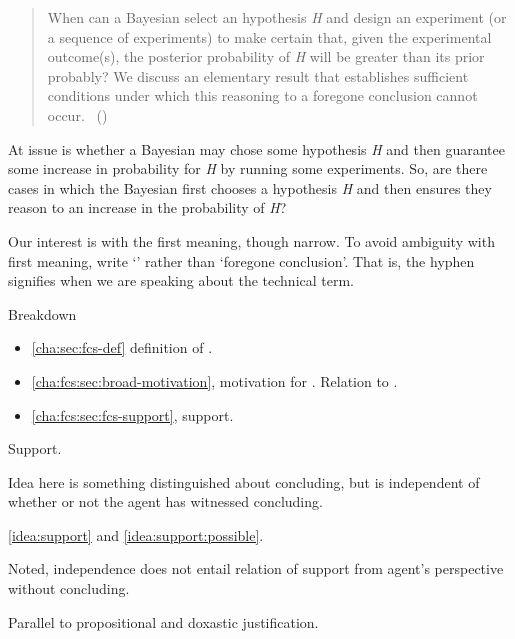 \begin{note}
  \begin{quote}
    When can a Bayesian select an hypothesis \emph{H} and design an experiment (or a sequence of experiments) to make certain that, given the experimental outcome(s), the posterior probability of \emph{H} will be greater than its prior probably?
    We discuss an elementary result that establishes sufficient conditions under which this reasoning to a foregone conclusion cannot occur.%
    \mbox{ }\hfill\mbox{(\citeyear[1228]{Kadane:1996vu})}
  \end{quote}

  At issue is whether a Bayesian may chose some hypothesis \emph{H} and then guarantee some increase in probability for \emph{H} by running some experiments.
  So, are there cases in which the Bayesian first chooses a hypothesis \emph{H} and then ensures they reason to an increase in the probability of \emph{H}?
\end{note}

\begin{note}
  Our interest is with the first meaning, though narrow.
  To avoid ambiguity with first meaning, write `' rather than `foregone conclusion'.
  That is, the hyphen signifies when we are speaking about the technical term.
\end{note}

\begin{note}
  Breakdown
  \begin{itemize}
  \item
    \autoref{cha:sec:fcs-def} definition of .
  \item
    \autoref{cha:fcs:sec:broad-motivation}, motivation for .
    Relation to .
  \item
    \autoref{cha:fcs:sec:fcs-support}, support.
  \end{itemize}
\end{note}

\begin{note}
  Support.

  Idea here is something distinguished about concluding, but is independent of whether or not the agent has witnessed concluding.

  \autoref{idea:support} and \autoref{idea:support:possible}.

  Noted, independence does not entail relation of support from agent's perspective without concluding.

  Parallel to propositional and doxastic justification.
\end{note}


